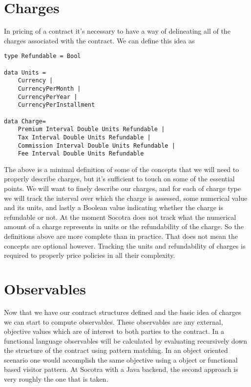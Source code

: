\section{Charges}
\label{sec:01:2}
In pricing of a contract it's necessary to have a way of delineating all of the charges associated with the contract. We can
define this idea as
\begin{lstlisting}
type Refundable = Bool

data Units = 
    Currency | 
    CurrencyPerMonth | 
    CurrencyPerYear | 
    CurrencyPerInstallment

data Charge= 
    Premium Interval Double Units Refundable |
    Tax Interval Double Units Refundable |
    Commission Interval Double Units Refundable |
    Fee Interval Double Units Refundable
\end{lstlisting}
The above is a minimal definition of some of the concepts that we will need to properly describe charges,
but it's sufficient to touch on some of the essential points. We will want to finely describe our charges, and
for each of charge type we will track the
interval over which the charge is assessed, some numerical value and its units, and lastly a Boolean value
indicating whether the charge is refundable or not. At the moment Socotra does not track what the numerical
amount of a charge represents in units or the refundability of the charge. So the definitions above are more
complete than in practice. That does not mean the concepts are optional however. Tracking the units and
refundability of charges is required to properly price policies in all their complexity.

\section{Observables}
\label{sec:01:3}
Now that we have our contract structures defined and the basic idea of charges we can start to compute
observables. These observables are any external, objective values which are of interest to both parties
to the contract. In a functional language observables will be calculated by evaluating recursively down
the structure of the contract using pattern matching. In an object oriented scenario one would accomplish
the same objective using a object or functional based visitor pattern. At Socotra with a Java backend, the
second approach is very roughly the one that is taken.

